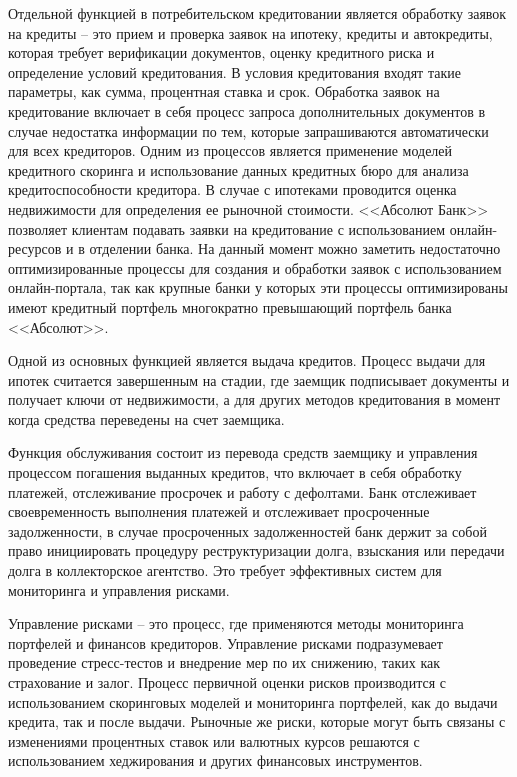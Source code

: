 \documentclass[14pt, a4paper]{extarticle}
\begin{document}
Отдельной функцией в потребительском кредитовании является обработку заявок на
кредиты -- это прием и проверка заявок на ипотеку, кредиты и автокредиты,
которая требует верификации документов, оценку кредитного риска и определение
условий кредитования. В условия кредитования входят такие параметры, как сумма,
процентная ставка и срок. Обработка заявок на кредитование включает в себя
процесс запроса дополнительных документов в случае недостатка информации по
тем, которые запрашиваются автоматически для всех кредиторов. Одним из
процессов является применение моделей кредитного скоринга и использование
данных кредитных бюро для анализа кредитоспособности кредитора. В случае с
ипотеками проводится оценка недвижимости для определения ее рыночной стоимости.
<<Абсолют Банк>> позволяет клиентам подавать заявки на кредитование с
использованием онлайн-ресурсов и в отделении банка. На данный момент можно
заметить недостаточно оптимизированные процессы для создания и обработки заявок
с использованием онлайн-портала, так как крупные банки у которых эти процессы
оптимизированы имеют кредитный портфель многократно превышающий портфель банка
<<Абсолют>>.

Одной из основных функцией является выдача кредитов. Процесс выдачи для ипотек
считается завершенным на стадии, где заемщик подписывает документы и получает
ключи от недвижимости, а для других методов кредитования в момент когда
средства переведены на счет заемщика.

Функция обслуживания состоит из перевода средств
заемщику и управления процессом погашения выданных кредитов, что включает в
себя обработку платежей, отслеживание просрочек и работу с дефолтами. Банк
отслеживает своевременность выполнения платежей и отслеживает просроченные
задолженности, в случае просроченных задолженностей банк держит за собой право 
инициировать процедуру реструктуризации долга, взыскания или передачи долга в
коллекторское агентство. Это требует эффективных систем для мониторинга и
управления рисками.

Управление рисками -- это процесс, где применяются методы
мониторинга портфелей и финансов кредиторов. Управление рисками подразумевает
проведение стресс-тестов и внедрение мер по их снижению, таких как страхование
и залог. Процесс первичной оценки рисков производится с использованием
скоринговых моделей и мониторинга портфелей, как до выдачи кредита, так и после
выдачи. Рыночные же риски, которые могут быть связаны с изменениями процентных
ставок или валютных курсов решаются с использованием хеджирования и других
финансовых инструментов.
\end{document}
